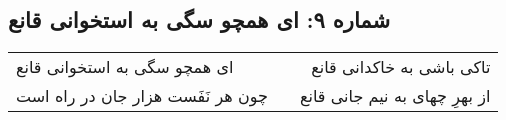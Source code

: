 \begin{center}
\section*{شماره ۹: ای همچو سگی به استخوانی قانع}
\label{sec:009}
\begin{longtable}{l p{0.5cm} r}
ای همچو سگی به استخوانی قانع
&&
تاکی باشی به خاکدانی قانع
\\
چون هر نَفَست هزار جان در راه است
&&
از بهرِ چهای به نیم جانی قانع
\\
\end{longtable}
\end{center}
